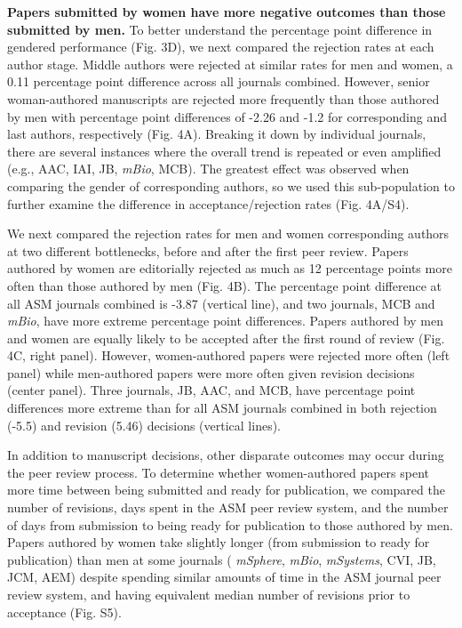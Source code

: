 \documentclass[11pt,]{article}
\begin{document}
\textbf{Papers submitted by women have more negative outcomes than those
submitted by men.} To better understand the percentage point difference
in gendered performance (Fig. 3D), we next compared the rejection rates
at each author stage. Middle authors were rejected at similar rates for
men and women, a 0.11 percentage point difference across all journals
combined. However, senior woman-authored manuscripts are rejected more
frequently than those authored by men with percentage point differences
of -2.26 and -1.2 for corresponding and last authors, respectively (Fig.
4A). Breaking it down by individual journals, there are several
instances where the overall trend is repeated or even amplified (e.g.,
AAC, IAI, JB, \emph{mBio}, MCB). The greatest effect was observed when
comparing the gender of corresponding authors, so we used this
sub-population to further examine the difference in acceptance/rejection
rates (Fig. 4A/S4).

We next compared the rejection rates for men and women corresponding
authors at two different bottlenecks, before and after the first peer
review. Papers authored by women are editorially rejected as much as 12
percentage points more often than those authored by men (Fig. 4B). The
percentage point difference at all ASM journals combined is -3.87
(vertical line), and two journals, MCB and \emph{mBio}, have more
extreme percentage point differences. Papers authored by men and women
are equally likely to be accepted after the first round of review (Fig.
4C, right panel). However, women-authored papers were rejected more
often (left panel) while men-authored papers were more often given
revision decisions (center panel). Three journals, JB, AAC, and MCB,
have percentage point differences more extreme than for all ASM journals
combined in both rejection (-5.5) and revision (5.46) decisions
(vertical lines).

In addition to manuscript decisions, other disparate outcomes may occur
during the peer review process. To determine whether women-authored
papers spent more time between being submitted and ready for
publication, we compared the number of revisions, days spent in the ASM
peer review system, and the number of days from submission to being
ready for publication to those authored by men. Papers authored by women
take slightly longer (from submission to ready for publication) than men
at some journals ( \emph{mSphere}, \emph{mBio}, \emph{mSystems}, CVI,
JB, JCM, AEM) despite spending similar amounts of time in the ASM
journal peer review system, and having equivalent median number of
revisions prior to acceptance (Fig. S5).
\end{document}
